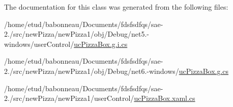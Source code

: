 The documentation for this class was generated from the following files\+:\begin{DoxyCompactItemize}
\item 
/home/etud/babonneau/\+Documents/fdsfsdfqs/sae-\/2./src/new\+Pizza/new\+Pizza1/obj/\+Debug/net5.-\/windows/user\+Control/\hyperlink{net5_80-windows_2userControl_2ucPizzaBox_8g_8i_8cs}{uc\+Pizza\+Box.\+g.\+i.\+cs}\item 
/home/etud/babonneau/\+Documents/fdsfsdfqs/sae-\/2./src/new\+Pizza/new\+Pizza1/obj/\+Debug/net6.-\/windows/\hyperlink{Debug_2net6_80-windows_2ucPizzaBox_8g_8cs}{uc\+Pizza\+Box.\+g.\+cs}\item 
/home/etud/babonneau/\+Documents/fdsfsdfqs/sae-\/2./src/new\+Pizza/new\+Pizza1/user\+Control/\hyperlink{ucPizzaBox_8xaml_8cs}{uc\+Pizza\+Box.\+xaml.\+cs}\end{DoxyCompactItemize}
